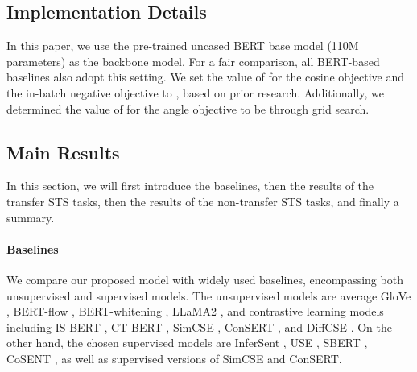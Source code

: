 \documentclass{article} \usepackage{iclr2024_conference,times}
\begin{document}
\subsection{Implementation Details}
In this paper, we use the pre-trained uncased BERT base model (110M parameters) as the backbone model. For a fair comparison, all BERT-based baselines also adopt this setting.
We set the value of  for the cosine objective and the in-batch negative objective to , based on prior research. Additionally, we determined the value of  for the angle objective to be  through grid search. 

\subsection{Main Results}
\label{sec-main-result}
In this section, we will first introduce the baselines, then the results of the transfer STS tasks, then the results of the non-transfer STS tasks, and finally a summary.

\paragraph{Baselines} We compare our proposed model with widely used baselines, encompassing both unsupervised and supervised models. The unsupervised models are average GloVe \citep{pennington-etal-2014-glove}, 
BERT-flow \citep{li-etal-2020-sentence}, BERT-whitening \citep{su2021whitening}, LLaMA2 \citep{touvron2023llama2}, and contrastive learning models including IS-BERT \citep{zhang-etal-2020-unsupervised}, CT-BERT \citep{carlsson2020semantic}, SimCSE \citep{simcse_gao_2021}, ConSERT \citep{consert_yan_2021}, and DiffCSE \citep{chuang-etal-2022-diffcse}. On the other hand, the chosen supervised models are InferSent \citep{conneau-etal-2017-supervised}, USE \citep{cer-etal-2018-universal}, SBERT \citep{sbert-nils-2019}, CoSENT \citep{cosent_su_2022}, as well as supervised versions of SimCSE and ConSERT.
\end{document}
